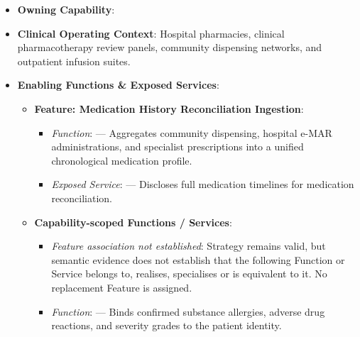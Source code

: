 \begin{itemize}

\item
\textbf{Owning Capability}: \texttt{}



\item
\textbf{Clinical Operating Context}: Hospital pharmacies, clinical pharmacotherapy review panels, community dispensing networks, and outpatient infusion suites.



\item
\textbf{Enabling Functions \& Exposed Services}:


\begin{itemize}

\item
\textbf{Feature: Medication History Reconciliation Ingestion}:


\begin{itemize}

\item
\emph{Function}: \texttt{} — Aggregates community dispensing, hospital e-MAR administrations, and specialist prescriptions into a unified chronological medication profile.



\item
\emph{Exposed Service}: \texttt{} — Discloses full medication timelines for medication reconciliation.



\end{itemize}


\item
\textbf{Capability-scoped Functions /\allowbreak{} Services}:


\begin{itemize}

\item
\emph{Feature association not established}: Strategy \texttt{} remains valid, but semantic evidence does not establish that the following Function or Service belongs to, realises, specialises or is equivalent to it. No replacement Feature is assigned.



\item
\emph{Function}: \texttt{} — Binds confirmed substance allergies, adverse drug reactions, and severity grades to the patient identity.




\end{itemize}
\end{itemize}
\end{itemize}
